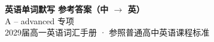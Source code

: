 \documentclass[10pt,a4paper]{article}
\begin{document}
\pagestyle{plain}

\begin{center}
{\LARGE\bfseries 英语单词默写 \quad 参考答案（中 $\to$ 英）}\\[0.22em]
{\large A -- advanced \quad 专项}\\[0.18em]
{\small 2029届高一英语词汇手册 · 参照普通高中英语课程标准}
\end{center}

\vspace{0.2em}
\noindent{\color{rulegray}\rule{\textwidth}{0.8pt}}

\vspace{0.35em}

\vspace{0.25em}
\renewcommand{\arraystretch}{1.62}
\end{document}

